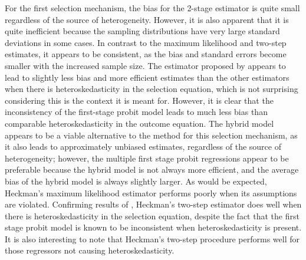 \documentclass{article}
\begin{document}
\begin{table}[htbp]


\end{table}

For the first selection mechanism, the bias for the \citet{reichert2014} 2-stage estimator is quite small regardless of the source of heterogeneity.  However, it is also apparent that it is quite inefficient because the sampling distributions have very large standard deviations in some cases.  In contrast to the \citet{heckman1979} maximum likelihood and two-step estimates, it appears to be consistent, as the bias and standard errors become smaller with the increased sample size.  The estimator proposed by \citet{schaffner2002} appears to lead to slightly less bias and more efficient estimates than the other estimators when there is heteroskedasticity in the selection equation, which is not surprising considering this is the context it is meant for.  However, it is clear that the inconsistency of the first-stage probit model leads to much less bias than comparable heteroskedasticity in the outcome equation.  The hybrid model appears to be a viable alternative to the \citet{reichert2014} method for this selection mechanism, as it also leads to approximately unbiased estimates, regardless of the source of heterogeneity; however, the multiple first stage probit regressions appear to be preferable because the hybrid model is not always more efficient, and the average bias of the hybrid model is always slightly larger.  As would be expected, Heckman's maximum likelihood estimator performs poorly when its assumptions are violated.  Confirming results of \citet{fernandez1999}, Heckman's two-step estimator does well when there is heteroskedasticity in the selection equation, despite the fact that the first stage probit model is known to be inconsistent when heteroskedasticity is present.  It is also interesting to note that Heckman's two-step procedure performs well for those regressors not causing heteroskedasticity.


\begin{table}[htbp]


\end{table}


\begin{table}[htbp]


\end{table}
\end{document}
